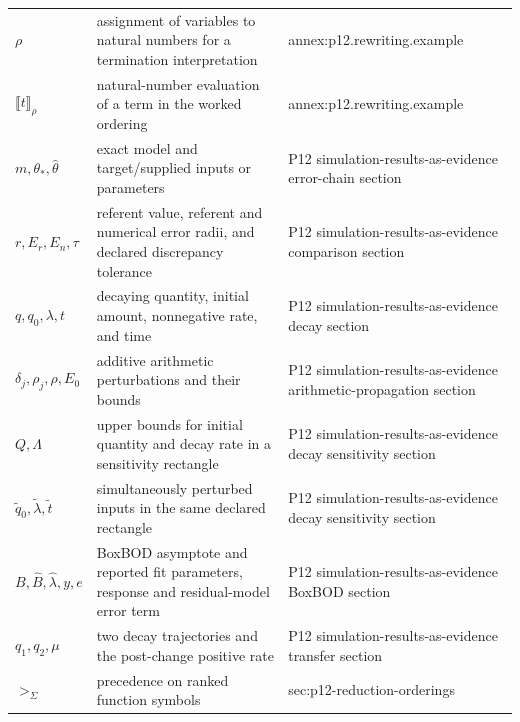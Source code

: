 \begin{longtable}{@{}p{}p{}p{}@{}}
\(\rho\) & assignment of variables to natural numbers for a termination interpretation & annex:\allowbreak{}p12.\allowbreak{}rewriting.\allowbreak{}example \\
\(\llbracket t\rrbracket_\rho\) & natural-number evaluation of a term in the worked ordering & annex:\allowbreak{}p12.\allowbreak{}rewriting.\allowbreak{}example \\
\(m,\allowbreak \theta_*,\allowbreak \widehat\theta\) & exact model and target/supplied inputs or parameters & P12 simulation-\allowbreak{}results-\allowbreak{}as-\allowbreak{}evidence error-\allowbreak{}chain section \\
\(r,\allowbreak E_r,\allowbreak E_n,\allowbreak \tau\) & referent value, referent and numerical error radii, and declared discrepancy tolerance & P12 simulation-\allowbreak{}results-\allowbreak{}as-\allowbreak{}evidence comparison section \\
\(q,\allowbreak q_0,\allowbreak \lambda,\allowbreak t\) & decaying quantity, initial amount, nonnegative rate, and time & P12 simulation-\allowbreak{}results-\allowbreak{}as-\allowbreak{}evidence decay section \\
\(\delta_j,\allowbreak \rho_j,\allowbreak \rho,\allowbreak E_0\) & additive arithmetic perturbations and their bounds & P12 simulation-\allowbreak{}results-\allowbreak{}as-\allowbreak{}evidence arithmetic-\allowbreak{}propagation section \\
\(Q,\allowbreak \Lambda\) & upper bounds for initial quantity and decay rate in a sensitivity rectangle & P12 simulation-\allowbreak{}results-\allowbreak{}as-\allowbreak{}evidence decay sensitivity section \\
\(\widetilde q_0,\allowbreak \widetilde\lambda,\allowbreak \widetilde t\) & simultaneously perturbed inputs in the same declared rectangle & P12 simulation-\allowbreak{}results-\allowbreak{}as-\allowbreak{}evidence decay sensitivity section \\
\(B,\allowbreak \widehat B,\allowbreak \widehat\lambda,\allowbreak y,\allowbreak e\) & BoxBOD asymptote and reported fit parameters, response and residual-model error term & P12 simulation-\allowbreak{}results-\allowbreak{}as-\allowbreak{}evidence BoxBOD section \\
\(q_1,\allowbreak q_2,\allowbreak \mu\) & two decay trajectories and the post-change positive rate & P12 simulation-\allowbreak{}results-\allowbreak{}as-\allowbreak{}evidence transfer section \\
\(>_\Sigma\) & precedence on ranked function symbols & sec:\allowbreak{}p12-\allowbreak{}reduction-\allowbreak{}orderings \\

\end{longtable}

